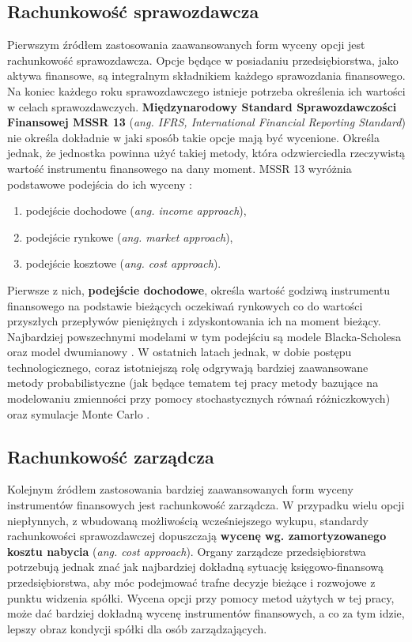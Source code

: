 \documentclass{pracamgr}
\begin{document}
\subsection{Rachunkowość sprawozdawcza} %
\label{sub:rachunkowosc_sprawozdawcza}
Pierwszym źródłem zastosowania zaawansowanych form wyceny opcji jest rachunkowość sprawozdawcza.
Opcje będące w posiadaniu przedsiębiorstwa, jako aktywa finansowe, są integralnym składnikiem każdego 
sprawozdania finansowego. Na koniec 
każdego roku sprawozdawczego istnieje potrzeba określenia ich wartości w celach sprawozdawczych.
\textbf{Międzynarodowy Standard Sprawozdawczości Finansowej MSSR 13} 
(\textit{ang. IFRS, International Financial Reporting Standard}) 
nie określa dokładnie w jaki sposób takie opcje mają być wycenione. 
Określa jednak, że jednostka powinna użyć takiej metody, która odzwierciedla
rzeczywistą  wartość instrumentu finansowego na dany moment. MSSR 13 wyróżnia podstawowe podejścia 
do ich wyceny \cite{IFRS2013}:
\begin{enumerate}
  \item podejście dochodowe (\textit{ang. income approach}),
  \item podejście rynkowe (\textit{ang. market approach}),
  \item podejście kosztowe (\textit{ang. cost approach}).
\end{enumerate}
Pierwsze z nich, \textbf{podejście dochodowe}, określa wartość godziwą instrumentu finansowego na 
podstawie bieżących oczekiwań rynkowych co do wartości 
przyszłych przepływów pieniężnych i zdyskontowania ich na moment bieżący. Najbardziej powszechnymi 
modelami w tym podejściu są modele Blacka-Scholesa 
oraz model dwumianowy  \cite{IFRS2013}. W ostatnich latach jednak, w dobie postępu technologicznego, 
coraz istotniejszą rolę odgrywają bardziej zaawansowane metody probabilistyczne
(jak będące tematem tej pracy metody bazujące na modelowaniu zmienności przy pomocy stochastycznych 
równań różniczkowych) oraz symulacje Monte Carlo  \cite{FairValue2010}.  


\subsection{Rachunkowość zarządcza} %
\label{sub:RachunkowoscZarzadcza}
Kolejnym źródłem zastosowania bardziej zaawansowanych form wyceny instrumentów finansowych jest 
rachunkowość zarządcza. 
W przypadku wielu opcji niepłynnych, z wbudowaną możliwością wcześniejszego wykupu, standardy 
rachunkowości sprawozdawczej dopuszczają
\textbf{wycenę wg. zamortyzowanego kosztu nabycia} (\textit{ang. cost approach}). Organy zarządcze 
przedsiębiorstwa potrzebują jednak znać jak najbardziej dokładną sytuację księgowo-finansową 
przedsiębiorstwa, aby móc podejmować trafne decyzje bieżące i rozwojowe z punktu widzenia spółki. 
Wycena opcji przy pomocy metod użytych w tej pracy, może dać bardziej dokładną wycenę instrumentów 
finansowych, a co za tym idzie, lepszy obraz kondycji spółki dla osób zarządzających.  
\end{document}
